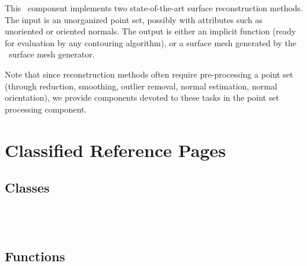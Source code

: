 


This \cgal\ component implements two state-of-the-art surface reconstruction methods. The input is an unorganized point set, possibly with attributes such as unoriented or oriented normals. The output is either an implicit function (ready for evaluation by any contouring algorithm), or a surface mesh generated by the \cgal\ surface mesh generator.

Note that since reconstruction methods often require pre-processing a point set (through reduction, smoothing, outlier removal, normal estimation, normal orientation), we provide components devoted to these tasks in the point set processing component. 

\section{Classified Reference Pages}

\subsection{Classes}

  \\
  \\


\subsection{Functions}

  \\
  \\
  \\
  \\

